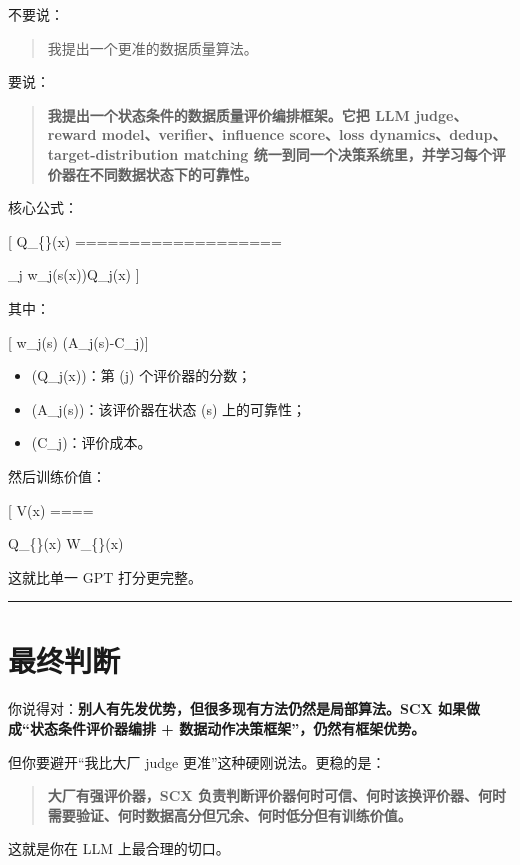\documentclass[
  12pt,
]{ctexart}
\providecommand{\tightlist}{%
  \setlength{\itemsep}{0pt}\setlength{\parskip}{0pt}}
\begin{document}
不要说：

\begin{quote}
我提出一个更准的数据质量算法。
\end{quote}

要说：

\begin{quote}
\textbf{我提出一个状态条件的数据质量评价编排框架。它把 LLM judge、reward
model、verifier、influence score、loss
dynamics、dedup、target-distribution matching
统一到同一个决策系统里，并学习每个评价器在不同数据状态下的可靠性。}
\end{quote}

核心公式：

{[} Q\_\{\}(x) ===================

\sum\_j w\_j(s(x))Q\_j(x) {]}

其中：

{[} w\_j(s) \propto \exp(\alpha A\_j(s)-\lambda C\_j){]}

\begin{itemize}
\tightlist
\item
  (Q\_j(x))：第 (j) 个评价器的分数；
\item
  (A\_j(s))：该评价器在状态 (s) 上的可靠性；
\item
  (C\_j)：评价成本。
\end{itemize}

然后训练价值：

{[} V(x) ====

Q\_\{\}(x) \cdot
[1-D(x)]\cdot W\_\{\}(x) \cdot
[1-N_{\mathrm{risk}}(x)]{]}

这就比单一 GPT 打分更完整。

\begin{center}\rule{0.5\linewidth}{0.5pt}\end{center}

\section{最终判断}\label{ux6700ux7ec8ux5224ux65ad-16}

你说得对：\textbf{别人有先发优势，但很多现有方法仍然是局部算法。SCX
如果做成``状态条件评价器编排 + 数据动作决策框架''，仍然有框架优势。}

但你要避开``我比大厂 judge 更准''这种硬刚说法。更稳的是：

\begin{quote}
\textbf{大厂有强评价器，SCX
负责判断评价器何时可信、何时该换评价器、何时需要验证、何时数据高分但冗余、何时低分但有训练价值。}
\end{quote}

这就是你在 LLM 上最合理的切口。
\end{document}
